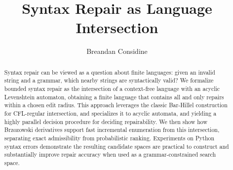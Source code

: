\documentclass[sigplan,acmsmall,nonacm]{acmart}%
\begin{document}
%
\title{Syntax Repair as Language Intersection}
%
\begin{abstract}
  Syntax repair can be viewed as a question about finite languages: given an invalid string and a grammar, which nearby strings are syntactically valid? We formalize bounded syntax repair as the intersection of a context-free language with an acyclic Levenshtein automaton, obtaining a finite language that contains all and only repairs within a chosen edit radius. This approach leverages the classic Bar-Hillel construction for CFL-regular intersection, and specializes it to acyclic automata, and yielding a highly parallel decision procedure for deciding repairability. We then show how Brzozowski derivatives support fast incremental enumeration from this intersection, separating exact admissibility from probabilistic ranking. Experiments on Python syntax errors demonstrate the resulting candidate spaces are practical to construct and substantially improve repair accuracy when used as a grammar-constrained search space.
\end{abstract}

\author{Breandan Considine}

\maketitle










%
\clearpage\vspace{-1cm}

\pagebreak\appendix







%
\end{document}
